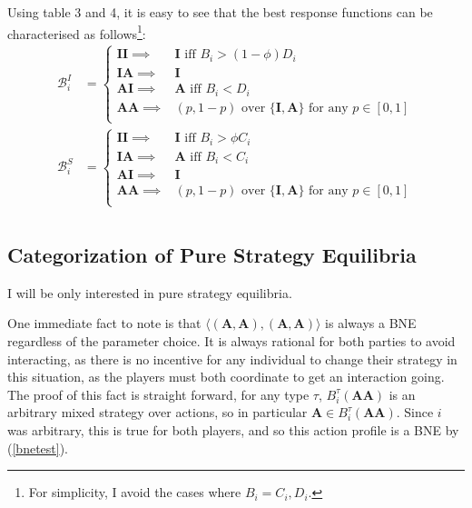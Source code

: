 \documentclass{article}
\theoremstyle{definition}
\theoremstyle{exercise}
\theoremstyle{remark}
\begin{document}
Using table 3 and 4, it is easy to see that the best response functions can be characterised as follows\footnote{For simplicity, I avoid the cases where $B_i = C_i, D_i$.}:
\begin{align*}
    \mathcal{B}^{I}_i &= \begin{cases}
        \bm{II} \implies& \text{$\bm{I}$ iff $B_i > (1 - \phi)D_i$} \\
        \bm{IA} \implies& \text{$\bm{I}$} \\
        \bm{AI} \implies& \text{$\bm{A}$ iff $B_i < D_i$} \\
        \bm{AA} \implies& \text{$(p, 1-p)$ over $\{\bm{I}, \bm{A}\}$ for any $p \in [0,1]$} \\
    \end{cases} \\
    \mathcal{B}^{S}_i &= \begin{cases}
        \bm{II} \implies& \text{$\bm{I}$ iff  $B_i > \phi C_i$} \\
        \bm{IA} \implies& \text{$\bm{A}$ iff $B_i < C_i$} \\
        \bm{AI} \implies& \text{$\bm{I}$} \\
        \bm{AA} \implies& \text{$(p, 1-p)$ over $\{\bm{I}, \bm{A}\}$ for any $p \in [0,1]$} \\
    \end{cases} \\
\end{align*}

\subsection*{Categorization of Pure Strategy Equilibria}
I will be only interested in pure strategy equilibria. %

One immediate fact to note is that $\langle  (\bm{A}, \bm{A}), (\bm{A}, \bm{A})\rangle$ is always a BNE regardless of the parameter choice. It is always rational for both parties to avoid interacting, as there is no incentive for any individual to change their strategy in this situation, as the players must both coordinate to get an interaction going. %
The proof of this fact is straight forward, for any type $\tau$, $B_i^{\tau}(\bm{AA})$ is an arbitrary mixed strategy over actions, so in particular $\bm{A} \in B_i^{\tau}(\bm{AA})$. Since $i$ was arbitrary, this is true for both players, and so this action profile is a BNE by (\ref{bnetest}).
\end{document}
